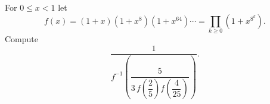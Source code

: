 For $0\le x<1$ let
\[
f(x)=(1+x)\left(1+x^8\right)\left(1+x^{64}\right)\cdots=\prod_{k\ge0}\left(1+x^{8^k}\right).
\]
Compute
\[
\dfrac{1}{f^{-1}\left(\dfrac{5}{3\,f\left(\dfrac{2}{5}\right)f\left(\dfrac{4}{25}\right)}\right)} .
\]
